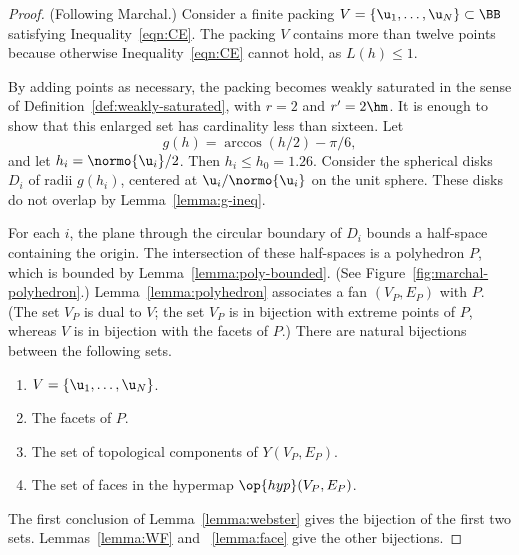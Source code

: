 \begin{proof} (Following Marchal.) Consider a finite packing $
  V=\{\u_1,\ldots, \u_N\}\subset \BB$ satisfying
  Inequality~\ref{eqn:CE}.  The packing $V$ contains more than twelve
  points because otherwise Inequality~\ref{eqn:CE} cannot hold, as
  $L(h)\le 1$.

  By adding points as necessary, the packing becomes weakly saturated
  in the sense of Definition~\ref{def:weakly-saturated}, with $r=2$
  and $r'=2\hm$.  It is enough to show that this enlarged set has
  cardinality less than sixteen.  Let
\[ %
g(h) = \arccos(h/2) - \pi/6,  %
\] %
and let $h_i =
\normo{ \u_i}/2$.  Then $h_i\le h_0=1.26$.
Consider the spherical disks $D_i$ of radii $g(h_i)$,
centered at $ \u_i/\normo{ \u_i}$ on the unit sphere.  
These disks do not overlap by Lemma~\ref{lemma:g-ineq}.


%
For each $i$, the plane through the circular boundary of $D_i$ bounds
a half-space containing the origin.  The intersection of these
half-spaces is a polyhedron $P$, which is bounded by
Lemma~\ref{lemma:poly-bounded}.  (See Figure~\ref{fig:marchal-polyhedron}.)
Lemma~\ref{lemma:polyhedron}
associates a fan $(V_P,E_P)$ with $P$.  (The set $V_P$ is dual to $
V$; the set $V_P$ is in bijection with extreme points of $P$, whereas
$ V$ is in bijection with the facets of $P$.)  There are natural
bijections between the following sets.
\begin{enumerate}\wasitemize  
\item $ V = \{ \u_1,\ldots, \u_N\}$.
\item The  facets of $P$.
\item The set of  topological components of $Y(V_P,E_P)$.
\item The set of faces in the hypermap $\op{hyp}(V_P,E_P)$.
\end{enumerate}\wasitemize 
The first conclusion
of Lemma~\ref{lemma:webster} gives 
the bijection of the first two sets.  Lemmas~\ref{lemma:WF} and
~\ref{lemma:face} give the other bijections.

\figZXEVDCA %


\end{proof}
